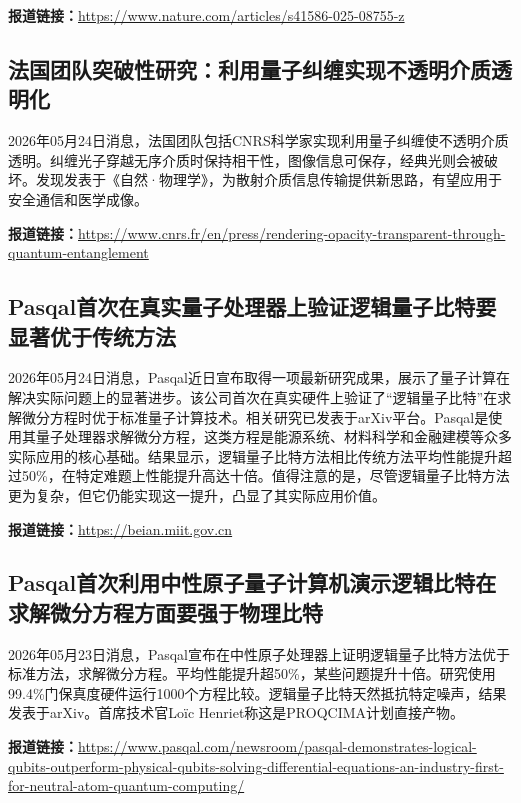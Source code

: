 \documentclass[12pt,a4paper]{ctexart}
\begin{document}
\noindent\textbf{报道链接：}\url{https://www.nature.com/articles/s41586-025-08755-z}

\subsection{ 法国团队突破性研究：利用量子纠缠实现不透明介质透明化 }

2026年05月24日消息，法国团队包括CNRS科学家实现利用量子纠缠使不透明介质透明。纠缠光子穿越无序介质时保持相干性，图像信息可保存，经典光则会被破坏。发现发表于《自然·物理学》，为散射介质信息传输提供新思路，有望应用于安全通信和医学成像。

\noindent\textbf{报道链接：}\url{https://www.cnrs.fr/en/press/rendering-opacity-transparent-through-quantum-entanglement}

\subsection{ Pasqal首次在真实量子处理器上验证逻辑量子比特要显著优于传统方法 }

2026年05月24日消息，Pasqal近日宣布取得一项最新研究成果，展示了量子计算在解决实际问题上的显著进步。该公司首次在真实硬件上验证了“逻辑量子比特”在求解微分方程时优于标准量子计算技术。相关研究已发表于arXiv平台。Pasqal是使用其量子处理器求解微分方程，这类方程是能源系统、材料科学和金融建模等众多实际应用的核心基础。结果显示，逻辑量子比特方法相比传统方法平均性能提升超过50\%，在特定难题上性能提升高达十倍。值得注意的是，尽管逻辑量子比特方法更为复杂，但它仍能实现这一提升，凸显了其实际应用价值。

\noindent\textbf{报道链接：}\url{https://beian.miit.gov.cn}

\subsection{ Pasqal首次利用中性原子量子计算机演示逻辑比特在求解微分方程方面要强于物理比特 }

2026年05月23日消息，Pasqal宣布在中性原子处理器上证明逻辑量子比特方法优于标准方法，求解微分方程。平均性能提升超50\%，某些问题提升十倍。研究使用99.4\%门保真度硬件运行1000个方程比较。逻辑量子比特天然抵抗特定噪声，结果发表于arXiv。首席技术官Loïc Henriet称这是PROQCIMA计划直接产物。

\noindent\textbf{报道链接：}\url{https://www.pasqal.com/newsroom/pasqal-demonstrates-logical-qubits-outperform-physical-qubits-solving-differential-equations-an-industry-first-for-neutral-atom-quantum-computing/}
\end{document}
